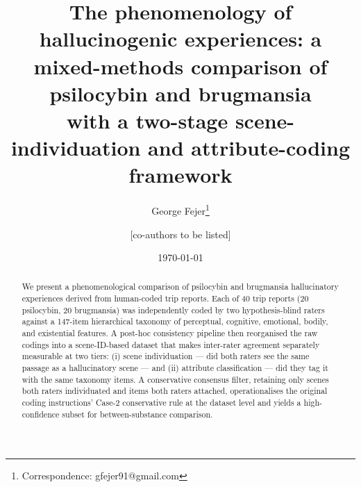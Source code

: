 \documentclass[11pt,a4paper]{article}
\title{The phenomenology of hallucinogenic experiences: a mixed-methods comparison of psilocybin and brugmansia\\
\large with a two-stage scene-individuation and attribute-coding framework}
\author[1]{George Fejer\thanks{Correspondence: gfejer91@gmail.com}}
\author[1]{[co-authors to be listed]}
\affil[1]{[affiliation]}
\date{\today}
\begin{document}
\maketitle

\begin{abstract}
We present a phenomenological comparison of psilocybin and brugmansia hallucinatory experiences derived from human-coded trip reports. Each of 40 trip reports (20 psilocybin, 20 brugmansia) was independently coded by two hypothesis-blind raters against a 147-item hierarchical taxonomy of perceptual, cognitive, emotional, bodily, and existential features. A post-hoc consistency pipeline then reorganised the raw codings into a scene-ID-based dataset that makes inter-rater agreement separately measurable at two tiers: (i) scene individuation --- did both raters see the same passage as a hallucinatory scene --- and (ii) attribute classification --- did they tag it with the same taxonomy items. A conservative consensus filter, retaining only scenes both raters individuated and items both raters attached, operationalises the original coding instructions' Case-2 conservative rule at the dataset level and yields a high-confidence subset for between-substance comparison.
\end{abstract}








\end{document}
